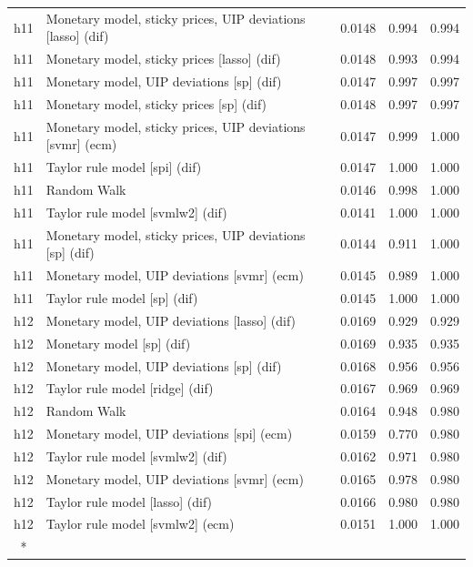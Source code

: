 \begin{ThreePartTable}
\begin{longtable}[t]{cp{5.5cm}ccc}
\addlinespace
h11 & \raggedright Monetary model, sticky prices, UIP deviations [lasso] (dif) & 0.0148 & 0.994 & 0.994\\
h11 & \raggedright Monetary model, sticky prices [lasso] (dif) & 0.0148 & 0.993 & 0.994\\
h11 & \raggedright Monetary model, UIP deviations [sp] (dif) & 0.0147 & 0.997 & 0.997\\
h11 & \raggedright Monetary model, sticky prices [sp] (dif) & 0.0148 & 0.997 & 0.997\\
h11 & \raggedright Monetary model, sticky prices, UIP deviations [svmr] (ecm) & 0.0147 & 0.999 & 1.000\\
h11 & \raggedright Taylor rule model [spi] (dif) & 0.0147 & 1.000 & 1.000\\
h11 & \raggedright Random Walk & 0.0146 & 0.998 & 1.000\\
h11 & \raggedright Taylor rule model [svmlw2] (dif) & 0.0141 & 1.000 & 1.000\\
h11 & \raggedright Monetary model, sticky prices, UIP deviations [sp] (dif) & 0.0144 & 0.911 & 1.000\\
h11 & \raggedright Monetary model, UIP deviations [svmr] (ecm) & 0.0145 & 0.989 & 1.000\\
h11 & \raggedright Taylor rule model [sp] (dif) & 0.0145 & 1.000 & 1.000\\
\addlinespace
h12 & \raggedright Monetary model, UIP deviations [lasso] (dif) & 0.0169 & 0.929 & 0.929\\
h12 & \raggedright Monetary model [sp] (dif) & 0.0169 & 0.935 & 0.935\\
h12 & \raggedright Monetary model, UIP deviations [sp] (dif) & 0.0168 & 0.956 & 0.956\\
h12 & \raggedright Taylor rule model [ridge] (dif) & 0.0167 & 0.969 & 0.969\\
h12 & \raggedright Random Walk & 0.0164 & 0.948 & 0.980\\
h12 & \raggedright Monetary model, UIP deviations [spi] (ecm) & 0.0159 & 0.770 & 0.980\\
h12 & \raggedright Taylor rule model [svmlw2] (dif) & 0.0162 & 0.971 & 0.980\\
h12 & \raggedright Monetary model, UIP deviations [svmr] (ecm) & 0.0165 & 0.978 & 0.980\\
h12 & \raggedright Taylor rule model [lasso] (dif) & 0.0166 & 0.980 & 0.980\\
h12 & \raggedright Taylor rule model [svmlw2] (ecm) & 0.0151 & 1.000 & 1.000\\*
\end{longtable}
\end{ThreePartTable}
\endgroup{}
